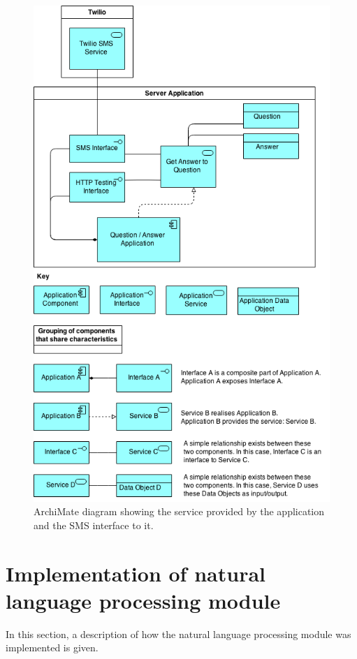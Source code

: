 \documentclass[authoryearcitations]{UoYCSproject}
\begin{document}
\begin{figure}[htb] 
\centerline{\includegraphics[width=\linewidth]{systemSmsInterface}}
\caption{ArchiMate diagram showing the service provided by the application and the SMS interface to it.}
\label{fig:systemSmsInterface}
\end{figure}

\section{Implementation of natural language processing module}
\label{sec:impNlp}
In this section, a description of how the natural language processing module was implemented is given.
\end{document}
